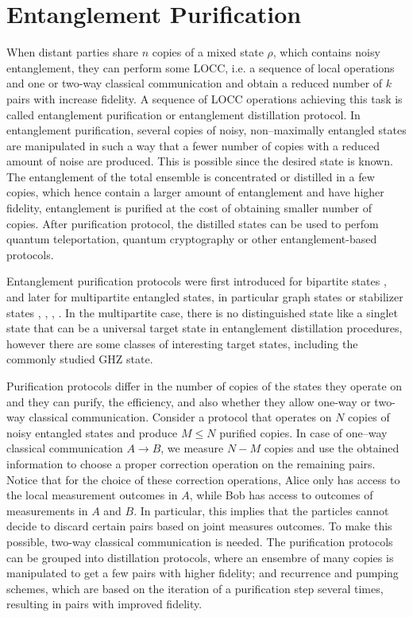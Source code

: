 \documentclass[10pt,a4paper]{book}
\numberwithin{equation}{chapter}
\numberwithin{figure}{chapter}
\numberwithin{table}{chapter}
\begin{document}
\section{Entanglement Purification}

When distant parties share $n$ copies of a mixed state $\rho$, which contains noisy entanglement, they can perform some LOCC, i.e. a sequence of local operations and one or two-way classical communication and obtain a reduced number of $k$ pairs with increase fidelity. A sequence of LOCC operations achieving this task is called entanglement purification or entanglement distillation protocol. In entanglement purification, several copies of noisy, non–maximally entangled states are manipulated in such a way that a fewer number of copies with a reduced amount of noise are produced. This is possible since the desired state is known. The entanglement of the total ensemble is concentrated or distilled in a few copies, which hence contain a larger amount of entanglement and have higher fidelity, entanglement is purified at the cost of obtaining smaller number of copies. After purification protocol, the distilled states can be used to perfom quantum teleportation, quantum cryptography or other entanglement-based protocols. 

Entanglement purification protocols were first introduced for bipartite states \cite{EPbi}, and later for multipartite entangled states, in particular graph states or stabilizer states \cite{EPgraph}, \cite{EPandQEC}, \cite{MultiEPGS}, \cite{EPtwocolor}. In the multipartite case, there is no distinguished state like a singlet state that can be a universal target state in entanglement distillation procedures, however there are some classes of interesting target states, including the commonly studied GHZ state. 

Purification protocols differ in the number of copies of the states they operate on and they can purify, the efficiency, and also whether they allow one-way or two-way classical communication. Consider a protocol that operates on $N$ copies of noisy entangled states and produce $M\leq N$ purified copies. In case of one–way classical communication $A \rightarrow B$, we measure $N - M$ copies and use the obtained information to choose a proper correction operation on the remaining pairs. Notice that for the choice of these correction operations, Alice only has access to the local measurement outcomes in $A$, while Bob has access to outcomes of measurements in $A$ and $B$. In particular, this implies that the particles cannot decide to discard certain pairs based on joint measures outcomes. To make this possible, two-way classical communication is needed. The purification protocols can be grouped into distillation protocols, where an ensembre of many copies is manipulated to get a few pairs with higher fidelity; and recurrence and pumping schemes, which are based on the iteration of a purification step several times, resulting in pairs with improved fidelity.
\end{document}
